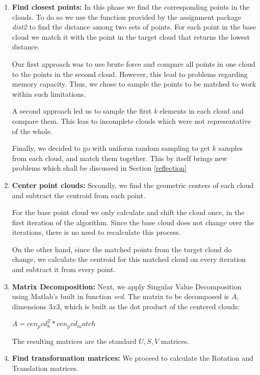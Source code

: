 \documentclass[11pt]{article}
\begin{document}
\begin{enumerate}
	\item \textbf{Find closest points:} In this phase we find the corresponding points in the clouds. To do so we use the function provided by the assignment package \textit{dist2} to find the distance among two sets of points. For each point in the base cloud we match it with the point in the target cloud that returns the lowest distance. 
	
	Our first approach was to use brute force and compare all points in one cloud to the points in the second cloud. However, this lead to problems regarding memory capacity. Thus, we chose to sample the points to be matched to work within such limitations.
	
	A second approach led us to sample the first \textit{k} elements in each cloud and compare them. This leas to incomplete clouds which were not representative of the whole.
	
	Finally, we decided to go with uniform random sampling to get $k$ samples from each cloud, and match them together. This by itself brings new problems which shall be discussed in Section \ref{reflection}
	
	\item \textbf{Center point clouds:} Secondly, we find the geometric centers of each cloud and subtract the centroid from each point. 
	
	For the base point cloud we only calculate and shift the cloud once, in the first iteration of the algorithm. Since the base cloud does not change over the iterations, there is no need to recalculate this process.
	
	On the other hand, since the matched points from the target cloud do change, we calculate the centroid for this matched cloud on every iteration and subtract it from every point.
	
	\item \textbf{Matrix Decomposition:} Next, we apply Singular Value Decomposition using Matlab's built in function \textit{svd}. The matrix to be decomposed is $A$, dimensions $3 x 3$, which is built as the dot product of the centered clouds: 
	
	\begin{center}
		$A = cen_pcd_b^T * cen_pcd_match$
	\end{center}
	
	The resulting matrices are the standard $U, S, V$ matrices.	
	
	\item \textbf{Find transformation matrices:} We proceed to calculate the Rotation and Translation matrices. 
	

\end{enumerate}
\end{document}
